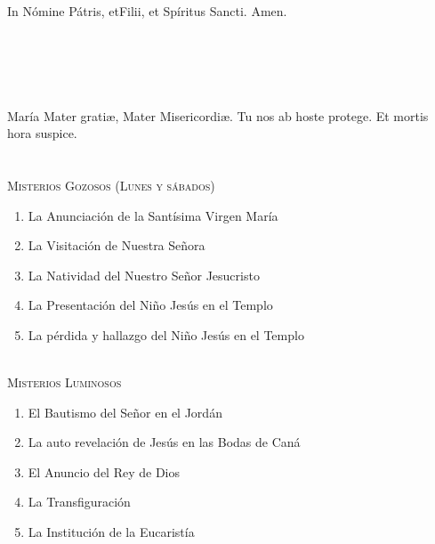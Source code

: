 \documentclass[9pt]{article}
\date{Valladolid (España), \monthyeardate\today}
\begin{document}
\begin{multicols*}{2}

    In Nómine Pátris, et{\redcross}Filii, et Spíritus Sancti. Amen.\\

    \\

    \\
    \\
    \\\\
    María Mater grati{\ae}, Mater Misericordi{\ae}. Tu nos ab hoste protege. Et mortis hora suspice.\\
    
    \\

    \small{}\\
    \textsc{Misterios Gozosos (Lunes y sábados)}
    \begin{enumerate}
        \item La Anunciación de la Santísima Virgen María
        \item La Visitación de Nuestra Señora
        \item La Natividad del Nuestro Señor Jesucristo
        \item La Presentación del Niño Jesús en el Templo
        \item La pérdida y hallazgo del Niño Jesús en el Templo
    \end{enumerate}

    \small{}\\
    \textsc{Misterios Luminosos}
    \begin{enumerate}
        \item El Bautismo del Señor en el Jordán
        \item La auto revelación de Jesús en las Bodas de Caná
        \item El Anuncio del Rey de Dios
        \item La Transfiguración
        \item La Institución de la Eucaristía
    \end{enumerate}


\end{multicols*}
\end{document}
